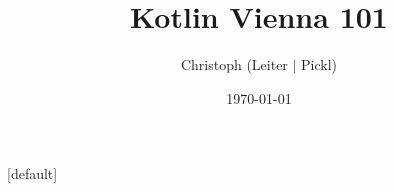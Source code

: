 \documentclass{beamer}
\begin{document}
\title{Kotlin Vienna 101}   
\author{Christoph (Leiter $\vert$ Pickl)} 
\date{\today} 


{
\makeatletter
    [default]
    \def\beamer@entrycode{\vspace*{-\headheight}}
\makeatother
\frame{\titlepage}
}






\end{document}
